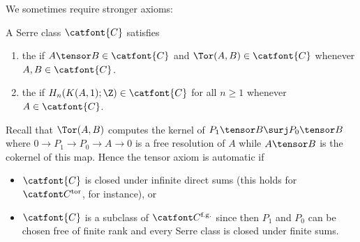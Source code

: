 We sometimes require stronger axioms:
\begin{definition}
	A Serre class $\catfont{C}$ satisfies
	\begin{enumerate}
		\item the  if $A \tensor B \in \catfont{C}$ and $\Tor(A, B) \in \catfont{C}$ whenever $A, B \in \catfont{C}$.
		\item the  if $H_n(K(A, 1); \Z) \in \catfont{C}$ for all $n \geq 1$ whenever $A \in \catfont{C}$.
	\end{enumerate}
\end{definition}
Recall that $\Tor(A, B)$ computes the kernel of $P_1 \tensor B \surj P_0 \tensor B$ where $0 \to P_1 \to P_0 \to A \to 0$ is a free resolution of $A$ while $A \tensor B$ is the cokernel of this map.
Hence the tensor axiom is automatic if
\begin{itemize}
	\item $\catfont{C}$ is closed under infinite direct sums (this holds for $\Ctor$, for instance), or
	\item $\catfont{C}$ is a subclass of $\Cfg$ since then $P_1$ and $P_0$ can be chosen free of finite rank and every Serre class is closed under finite sums.
\end{itemize}

